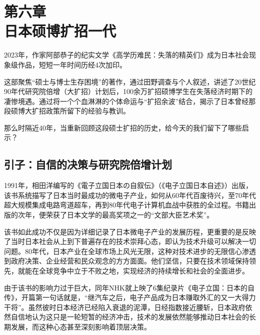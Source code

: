 

\section[第六章\q 日本硕博扩招一代]{第六章\\ 日本硕博扩招一代}


{\fangsong 2023年，作家阿部恭子的纪实文学《高学历难民：失落的精英们》成为日本社会现象级作品，短短一年时间历经4次加印。\par}

{\fangsong 这部聚焦“硕士与博士生存困境”的著作，通过田野调查与个人叙述，讲述了20世纪90年代研究院倍增（大扩招）计划后，100余万扩招硕博学生在失落经济时期下的凄惨境遇。通过将一个个血淋淋的个体命运与“扩招余波”结合，揭示了日本曾经那段硕博大扩招政策所留下的经验与教训。\par}

{\fangsong 那么时隔近40年，当重新回顾这段硕士扩招的历史，给今天的我们留下了哪些启示？\par}

\subsection{引子：自信的决策与研究院倍增计划}

1991年，相田洋编写的《電子立国日本の自叙伝》（《电子立国日本自述》）出版，该书系统描写了日本当时最成功的微电子产业，如何从60年代百废待兴，至70年代超大规模集成电路弯道超车，再到80年代电子计算机血战中获胜的全过程。书籍出版的次年，便荣获了日本文学的最高奖项之一的“文部大臣艺术奖”。

该书如此成功不仅是因为详细记录了日本微电子产业的发展历程，更重要的是反映了当时日本社会从上到下普遍存在的技术崇拜心态，即认为技术升级可以解决一切问题。80年代，日本产业在全球市场上风光无限，这种对技术进步的无限信心渗透到政府决策、企业经营和民众观念的方方面面。他们坚信，只要在技术领域保持领先，就能在全球竞争中立于不败之地，实现经济的持续增长和社会的全面进步。

由于该书的影响力过于巨大，同年NHK就上映了6集纪录片《电子立国：日本的自传》，开篇第一句话就是，“继汽车之后，电子产品成为日本赚取外汇的又一大得力干将”。虽然彼时日本经济已经陷入衰退的泥潭，日经指数接近腰斩，日本政府依然自信地认为这只是一轮短暂的经济冲击，技术的发展依然能够推动日本社会的长期发展，而这种心态甚至深刻影响着顶层决策。

